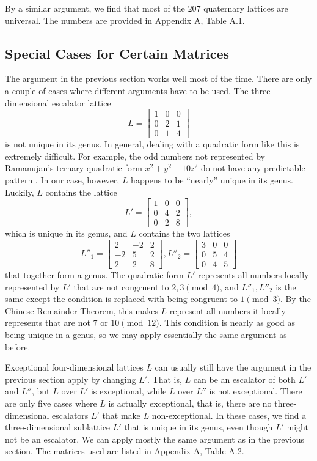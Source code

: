 \documentclass[letterpaper, 12pt]{article}
\begin{document}
By a similar argument, we find that most of the $207$ quaternary lattices are universal. The numbers are provided in Appendix A, Table A.1.

\subsection{Special Cases for Certain Matrices}
The argument in the previous section works well most of the time. There are only a couple of cases where different arguments have to be used. The three-dimensional escalator lattice
\[L = \begin{bmatrix} 1 & 0 & 0 \\ 0 & 2 & 1 \\ 0 & 1 & 4 \end{bmatrix}\]
is not unique in its genus.
In general, dealing with a quadratic form like this is extremely difficult. For example, the odd numbers not represented by Ramanujan's ternary quadratic form $x^2 + y^2 + 10z^2$ do not have any predictable pattern \cite{OnoSoundararajan1997}.
In our case, however, $L$ happens to be ``nearly'' unique in its genus. Luckily, $L$ contains the lattice
\[L' = \begin{bmatrix} 1 & 0 & 0 \\ 0 & 4 & 2 \\ 0 & 2 & 8 \end{bmatrix},\]
which is unique in its genus, and $L$ contains the two lattices
\[L''_1 = \begin{bmatrix} 2 & -2 & 2 \\ -2 & 5 & 2 \\ 2 & 2 & 8 \end{bmatrix}, L''_2 = \begin{bmatrix} 3 & 0 & 0 \\ 0 & 5 & 4 \\ 0 & 4 & 5 \end{bmatrix}\]
that together form a genus. The quadratic form $L'$ represents all numbers locally represented by $L'$ that are not congruent to $2, 3 \pmod 4$, and $L''_1, L''_2$ is the same except the condition is replaced with being congruent to $1 \pmod 3$. By the Chinese Remainder Theorem, this makes $L$ represent all numbers it locally represents that are not $7$ or $10 \pmod{12}$. This condition is nearly as good as being unique in a genus, so we may apply essentially the same argument as before.

Exceptional four-dimensional lattices $L$ can usually still have the argument in the previous section apply by changing $L'$. That is, $L$ can be an escalator of both $L'$ and $L''$, but $L$ over $L'$ is exceptional, while $L$ over $L''$ is not exceptional. There are only five cases where $L$ is actually exceptional, that is, there are no three-dimensional escalators $L'$ that make $L$ non-exceptional. In these cases, we find a three-dimensional sublattice $L'$ that is unique in its genus, even though $L'$ might not be an escalator. We can apply mostly the same argument as in the previous section. The matrices used are listed in Appendix A, Table A.2.
\end{document}
